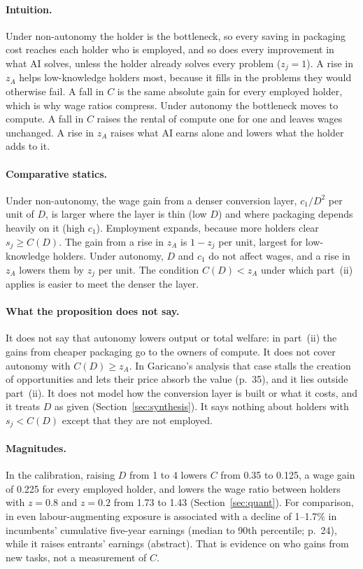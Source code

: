 \documentclass[12pt]{article}
\theoremstyle{remark}
\begin{document}
\paragraph{Intuition.} Under non-autonomy the holder is the bottleneck, so every saving in packaging cost reaches each holder who is employed, and so does every improvement in what AI solves, unless the holder already solves every problem ($z_j=1$). A rise in $z_A$ helps low-knowledge holders most, because it fills in the problems they would otherwise fail. A fall in $C$ is the same absolute gain for every employed holder, which is why wage ratios compress. Under autonomy the bottleneck moves to compute. A fall in $C$ raises the rental of compute one for one and leaves wages unchanged. A rise in $z_A$ raises what AI earns alone and lowers what the holder adds to it.

\paragraph{Comparative statics.} Under non-autonomy, the wage gain from a denser conversion layer, $c_1/D^2$ per unit of $D$, is larger where the layer is thin (low $D$) and where packaging depends heavily on it (high $c_1$). Employment expands, because more holders clear $s_j\ge C(D)$. The gain from a rise in $z_A$ is $1-z_j$ per unit, largest for low-knowledge holders. Under autonomy, $D$ and $c_1$ do not affect wages, and a rise in $z_A$ lowers them by $z_j$ per unit. The condition $C(D)<z_A$ under which part~(ii) applies is easier to meet the denser the layer.

\paragraph{What the proposition does not say.} It does not say that autonomy lowers output or total welfare: in part~(ii) the gains from cheaper packaging go to the owners of compute. It does not cover autonomy with $C(D)\ge z_A$. In Garicano's analysis that case stalls the creation of opportunities and lets their price absorb the value (p.~35), and it lies outside part~(ii). It does not model how the conversion layer is built or what it costs, and it treats $D$ as given (Section~\ref{sec:synthesis}). It says nothing about holders with $s_j<C(D)$ except that they are not employed.

\paragraph{Magnitudes.} In the calibration, raising $D$ from 1 to 4 lowers $C$ from 0.35 to 0.125, a wage gain of 0.225 for every employed holder, and lowers the wage ratio between holders with $z=0.8$ and $z=0.2$ from 1.73 to 1.43 (Section~\ref{sec:quant}). For comparison, in \citet{kogan2023displacement} even labour-augmenting exposure is associated with a decline of 1--1.7\% in incumbents' cumulative five-year earnings (median to 90th percentile; p.~24), while it raises entrants' earnings (abstract). That is evidence on who gains from new tasks, not a measurement of $C$.
\end{document}
